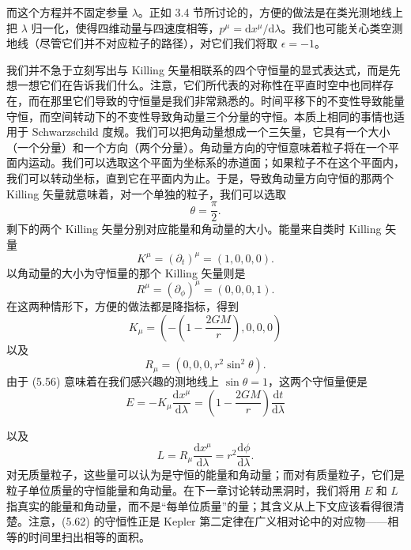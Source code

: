 而这个方程并不固定参量 $\lambda$。正如 3.4 节所讨论的，方便的做法是在类光测地线上把 $\lambda$ 归一化，使得四维动量与四速度相等，$p^\mu = \mathrm{d}x^\mu/\mathrm{d}\lambda$。我们也可能关心类空测地线（尽管它们并不对应粒子的路径），对它们我们将取 $\epsilon = -1$。

我们并不急于立刻写出与 Killing 矢量相联系的四个守恒量的显式表达式，而是先想一想它们在告诉我们什么。注意，它们所代表的对称性在平直时空中也同样存在，而在那里它们导致的守恒量是我们非常熟悉的。时间平移下的不变性导致能量守恒，而空间转动下的不变性导致角动量三个分量的守恒。本质上相同的事情也适用于 Schwarzschild 度规。我们可以把角动量想成一个三矢量，它具有一个大小（一个分量）和一个方向（两个分量）。角动量方向的守恒意味着粒子将在一个平面内运动。我们可以选取这个平面为坐标系的赤道面；如果粒子不在这个平面内，我们可以转动坐标，直到它在平面内为止。于是，导致角动量方向守恒的那两个 Killing 矢量就意味着，对一个单独的粒子，我们可以选取
\begin{equation*}
\theta = \frac{\pi}{2}.
\tag{5.56}
\end{equation*}
剩下的两个 Killing 矢量分别对应能量和角动量的大小。能量来自类时 Killing 矢量
\begin{equation*}
K^\mu = (\partial_t)^\mu = (1, 0, 0, 0).
\tag{5.57}
\end{equation*}
以角动量的大小为守恒量的那个 Killing 矢量则是
\begin{equation*}
R^\mu = (\partial_\phi)^\mu = (0, 0, 0, 1).
\tag{5.58}
\end{equation*}
在这两种情形下，方便的做法都是降指标，得到
\begin{equation*}
K_\mu = \left(-\left(1-\frac{2GM}{r}\right), 0, 0, 0\right)
\tag{5.59}
\end{equation*}
以及
\begin{equation*}
R_\mu = \left(0, 0, 0, r^2\sin^2\theta\right).
\tag{5.60}
\end{equation*}
由于 (5.56) 意味着在我们感兴趣的测地线上 $\sin\theta = 1$，这两个守恒量便是
\begin{equation*}
E = -K_\mu\frac{\mathrm{d}x^\mu}{\mathrm{d}\lambda} = \left(1-\frac{2GM}{r}\right)\frac{\mathrm{d}t}{\mathrm{d}\lambda}
\tag{5.61}
\end{equation*}

以及
\begin{equation*}
L = R_\mu\frac{\mathrm{d}x^\mu}{\mathrm{d}\lambda} = r^2\frac{\mathrm{d}\phi}{\mathrm{d}\lambda}.
\tag{5.62}
\end{equation*}
对无质量粒子，这些量可以认为是守恒的能量和角动量；而对有质量粒子，它们是粒子单位质量的守恒能量和角动量。在下一章讨论转动黑洞时，我们将用 $E$ 和 $L$ 指真实的能量和角动量，而不是“每单位质量”的量；其含义从上下文应该看得很清楚。注意，(5.62) 的守恒性正是 Kepler 第二定律在广义相对论中的对应物——相等的时间里扫出相等的面积。

